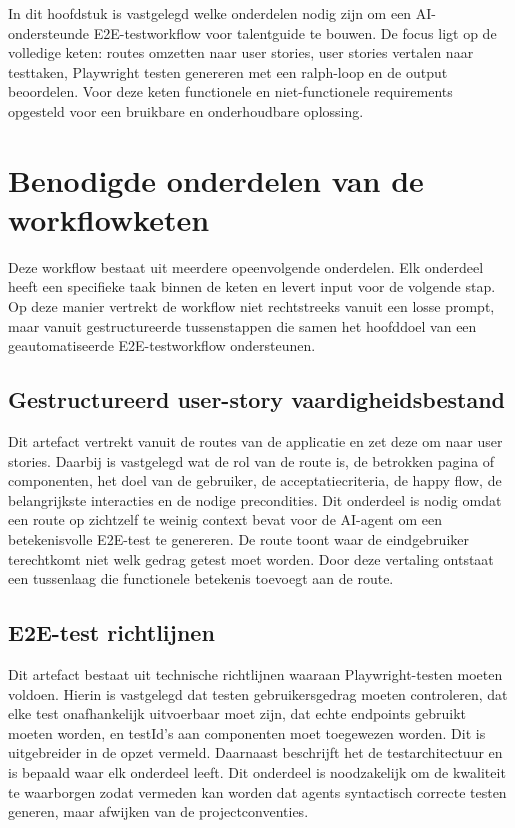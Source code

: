 In dit hoofdstuk is vastgelegd welke onderdelen nodig zijn om een AI-ondersteunde E2E-testworkflow voor talentguide te bouwen. De focus ligt op de volledige keten: routes omzetten naar user stories, user stories vertalen naar testtaken, Playwright testen genereren met een ralph-loop en de output beoordelen. Voor deze keten functionele en niet-functionele requirements opgesteld voor een bruikbare en onderhoudbare oplossing.

\section{Benodigde onderdelen van de workflowketen}
Deze workflow bestaat uit meerdere opeenvolgende onderdelen. Elk onderdeel heeft een specifieke taak binnen de keten en levert input voor de volgende stap. Op deze manier vertrekt de workflow niet rechtstreeks vanuit een losse prompt, maar vanuit gestructureerde tussenstappen die samen het hoofddoel van een geautomatiseerde E2E-testworkflow ondersteunen.


\subsection{Gestructureerd user-story vaardigheidsbestand}
Dit artefact vertrekt vanuit de routes van de applicatie en zet deze om naar user stories. Daarbij is vastgelegd wat de rol van de route is, de betrokken pagina of componenten, het doel van de gebruiker, de acceptatiecriteria, de happy flow, de belangrijkste interacties en de nodige precondities.
Dit onderdeel is nodig omdat een route op zichtzelf te weinig context bevat voor de AI-agent om een betekenisvolle E2E-test te genereren. De route toont waar de eindgebruiker terechtkomt niet welk gedrag getest moet worden. Door deze vertaling ontstaat een tussenlaag die functionele betekenis toevoegt aan de route.

\subsection{E2E-test richtlijnen}
Dit artefact bestaat uit technische richtlijnen waaraan Playwright-testen moeten voldoen. Hierin is vastgelegd dat testen gebruikersgedrag moeten controleren, dat elke test onafhankelijk uitvoerbaar moet zijn, dat echte endpoints gebruikt moeten worden, en testId’s aan componenten moet toegewezen worden. Dit is uitgebreider in de opzet vermeld. Daarnaast beschrijft het de testarchitectuur en is bepaald waar elk onderdeel leeft.
Dit onderdeel is noodzakelijk om de kwaliteit te waarborgen zodat vermeden kan worden dat agents syntactisch correcte testen generen, maar afwijken van de projectconventies.

